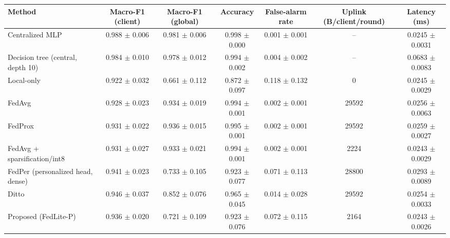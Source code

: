 \begin{tabular}{lcccccc}
\toprule
Method & Macro-F1 (client) & Macro-F1 (global) & Accuracy & False-alarm rate & Uplink (B/client/round) & Latency (ms)\\
\midrule
Centralized MLP & 0.988 $\pm$ 0.006 & 0.981 $\pm$ 0.006 & 0.998 $\pm$ 0.000 & 0.001 $\pm$ 0.001 & -- & 0.0245 $\pm$ 0.0031\\
Decision tree (central, depth 10) & 0.984 $\pm$ 0.010 & 0.978 $\pm$ 0.012 & 0.994 $\pm$ 0.002 & 0.004 $\pm$ 0.002 & -- & 0.0683 $\pm$ 0.0083\\
Local-only & 0.922 $\pm$ 0.032 & 0.661 $\pm$ 0.112 & 0.872 $\pm$ 0.097 & 0.118 $\pm$ 0.132 & 0 & 0.0245 $\pm$ 0.0029\\
FedAvg & 0.928 $\pm$ 0.023 & 0.934 $\pm$ 0.019 & 0.994 $\pm$ 0.001 & 0.002 $\pm$ 0.001 & 29592 & 0.0256 $\pm$ 0.0063\\
FedProx & 0.931 $\pm$ 0.022 & 0.936 $\pm$ 0.015 & 0.995 $\pm$ 0.001 & 0.002 $\pm$ 0.001 & 29592 & 0.0259 $\pm$ 0.0027\\
FedAvg + sparsification/int8 & 0.931 $\pm$ 0.027 & 0.933 $\pm$ 0.021 & 0.994 $\pm$ 0.001 & 0.002 $\pm$ 0.001 & 2224 & 0.0243 $\pm$ 0.0029\\
FedPer (personalized head, dense) & 0.941 $\pm$ 0.023 & 0.733 $\pm$ 0.105 & 0.923 $\pm$ 0.077 & 0.071 $\pm$ 0.113 & 28800 & 0.0293 $\pm$ 0.0089\\
Ditto & 0.946 $\pm$ 0.037 & 0.852 $\pm$ 0.076 & 0.965 $\pm$ 0.045 & 0.014 $\pm$ 0.028 & 29592 & 0.0254 $\pm$ 0.0033\\
Proposed (FedLite-P) & 0.936 $\pm$ 0.020 & 0.721 $\pm$ 0.109 & 0.923 $\pm$ 0.076 & 0.072 $\pm$ 0.115 & 2164 & 0.0243 $\pm$ 0.0026\\
\bottomrule
\end{tabular}